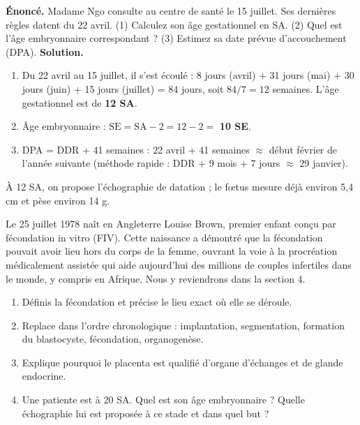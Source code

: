\documentclass[11pt]{article}
\begin{document}
\begin{exoresolu}
\textbf{Énoncé.} Madame Ngo consulte au centre de santé le 15 juillet. Ses dernières règles datent du 22 avril. (1) Calculez son âge gestationnel en SA. (2) Quel est l'âge embryonnaire correspondant ? (3) Estimez sa date prévue d'accouchement (DPA).
\tcblower
\textbf{Solution.}
\begin{enumerate}
\item Du 22 avril au 15 juillet, il s'est écoulé : 8 jours (avril) + 31 jours (mai) + 30 jours (juin) + 15 jours (juillet) = 84 jours, soit $84 / 7 = 12$ semaines. L'âge gestationnel est de \textbf{12 SA}.
\item Âge embryonnaire : $\text{SE} = \text{SA} - 2 = 12 - 2 =$ \textbf{10 SE}.
\item DPA = DDR + 41 semaines : 22 avril + 41 semaines $\approx$ début février de l'année suivante (méthode rapide : DDR + 9 mois + 7 jours $\approx$ 29 janvier).
\end{enumerate}
À 12 SA, on propose l'échographie de datation ; le fœtus mesure déjà environ 5,4 cm et pèse environ 14 g.
\end{exoresolu}

\begin{savaistu}
Le 25 juillet 1978 naît en Angleterre Louise Brown, premier enfant conçu par fécondation in vitro (FIV). Cette naissance a démontré que la fécondation pouvait avoir lieu hors du corps de la femme, ouvrant la voie à la procréation médicalement assistée qui aide aujourd'hui des millions de couples infertiles dans le monde, y compris en Afrique. Nous y reviendrons dans la section 4.
\end{savaistu}

\begin{exercice}
\begin{enumerate}
\item Définis la fécondation et précise le lieu exact où elle se déroule.
\item Replace dans l'ordre chronologique : implantation, segmentation, formation du blastocyste, fécondation, organogenèse.
\item Explique pourquoi le placenta est qualifié d'organe d'échanges et de glande endocrine.
\item Une patiente est à 20 SA. Quel est son âge embryonnaire ? Quelle échographie lui est proposée à ce stade et dans quel but ?
\end{enumerate}
\end{exercice}
\end{document}
